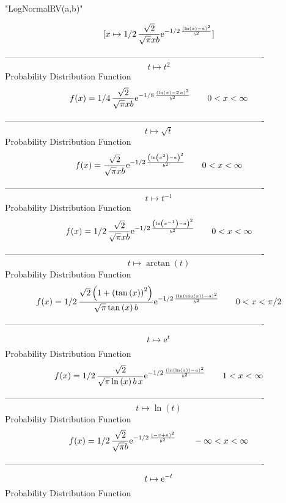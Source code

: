 \documentclass[12pt]{article}
\begin{document}
 
                             "LogNormalRV(a,b)"

$$[x\mapsto 1/2\,{\frac {\sqrt {2}}{\sqrt {\pi}xb}{{\rm e}^{-1/2\,{
\frac { \left( \ln  \left( x \right) -a \right) ^{2}}{{b}^{2}}}}}}]
$$-------------------------------------------------------------------------------------------  \\$$t\mapsto {t}^{2}
$$Probability Distribution Function 
$$  f(x)=1/4\,{\frac {\sqrt {2}}{\sqrt {\pi}xb}{{\rm e}^{-1/8\,{\frac { \left( 
\ln  \left( x \right) -2\,a \right) ^{2}}{{b}^{2}}}}}}
 \qquad0
 < x < \infty 
$$-------------------------------------------------------------------------------------------  \\$$t\mapsto \sqrt {t}
$$Probability Distribution Function 
$$  f(x)={\frac {\sqrt {2}}{\sqrt {\pi}xb}{{\rm e}^{-1/2\,{\frac { \left( \ln 
 \left( {x}^{2} \right) -a \right) ^{2}}{{b}^{2}}}}}}
 \qquad0
 < x < \infty 
$$-------------------------------------------------------------------------------------------  \\$$t\mapsto {t}^{-1}
$$Probability Distribution Function 
$$  f(x)=1/2\,{\frac {\sqrt {2}}{\sqrt {\pi}xb}{{\rm e}^{-1/2\,{\frac { \left( 
\ln  \left( {x}^{-1} \right) -a \right) ^{2}}{{b}^{2}}}}}}
 \qquad0
 < x < \infty 
$$-------------------------------------------------------------------------------------------  \\$$t\mapsto \arctan \left( t \right) 
$$Probability Distribution Function 
$$  f(x)=1/2\,{\frac {\sqrt {2} \left( 1+ \left( \tan \left( x \right) 
 \right) ^{2} \right) }{\sqrt {\pi}\tan \left( x \right) b}{{\rm e}^{-
1/2\,{\frac { \left( \ln  \left( \tan \left( x \right)  \right) -a
 \right) ^{2}}{{b}^{2}}}}}}
 \qquad0
 < x < \pi/2
$$-------------------------------------------------------------------------------------------  \\$$t\mapsto {{\rm e}^{t}}
$$Probability Distribution Function 
$$  f(x)=1/2\,{\frac {\sqrt {2}}{\sqrt {\pi}\ln  \left( x \right) b\,x}{{\rm e}
^{-1/2\,{\frac { \left( \ln  \left( \ln  \left( x \right)  \right) -a
 \right) ^{2}}{{b}^{2}}}}}}
 \qquad1
 < x < \infty 
$$-------------------------------------------------------------------------------------------  \\$$t\mapsto \ln  \left( t \right) 
$$Probability Distribution Function 
$$  f(x)=1/2\,{\frac {\sqrt {2}}{\sqrt {\pi}b}{{\rm e}^{-1/2\,{\frac { \left( -
x+a \right) ^{2}}{{b}^{2}}}}}}
 \qquad-\infty 
 < x < \infty 
$$-------------------------------------------------------------------------------------------  \\$$t\mapsto {{\rm e}^{-t}}
$$Probability Distribution Function 
\end{document}
